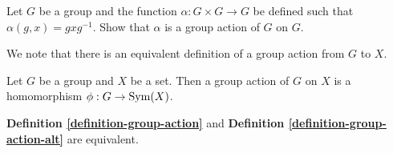 \begin{exercise}\label{exercise-conjugacy-is-group-action}
    Let $G$ be a group and the function $\alpha: G\times G \to G$ be defined such that $\alpha(g, x) = gxg^{-1}$. Show that $\alpha$ is a group action of $G$ on $G$.
\end{exercise}

We note that there is an equivalent definition of a group action from $G$ to $X$.
\begin{definition}\label{definition-group-action-alt}
    Let $G$ be a group and $X$ be a set. Then a group action of $G$ on $X$ is a homomorphism $\phi: G\to \mathrm{Sym}(X)$.
\end{definition}
\begin{theorem}\label{thrm-group-action-definition-equivalence}
    \textbf{Definition \ref{definition-group-action}} and \textbf{Definition \ref{definition-group-action-alt}} are equivalent.
\end{theorem}
